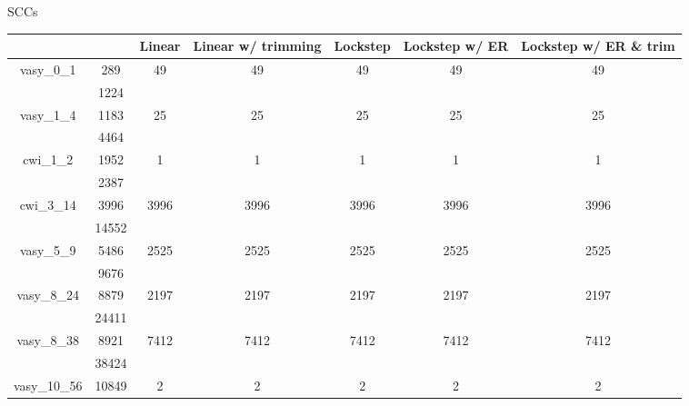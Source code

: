 \documentclass[../master/master.tex]{subfiles}
\begin{document}
SCCs
\begin{center}
\begin{tabular}{ |c|c||c||c||c||c||c|| } 
\hline
 \multicolumn{2}{|c||}{} & Linear & Linear w/ trimming & Lockstep & Lockstep w/ ER & Lockstep w/ ER \& trim \\
\hline
\multirow{2}{3.8em}{vasy\_0\_1} & 289 & \multirow{2}{3.8em}{49} & \multirow{2}{3.8em}{49} & \multirow{2}{3.8em}{49} & \multirow{2}{3.8em}{49} & \multirow{2}{3.8em}{49} \\
\cline{2-2}
 & 1224  & & & & & \\
\hline
\multirow{2}{3.8em}{vasy\_1\_4} & 1183 & \multirow{2}{3.8em}{25} & \multirow{2}{3.8em}{25} & \multirow{2}{3.8em}{25} & \multirow{2}{3.8em}{25} & \multirow{2}{3.8em}{25} \\
\cline{2-2}
 & 4464  & & & & & \\
\hline
\multirow{2}{3.8em}{cwi\_1\_2} & 1952 & \multirow{2}{3.8em}{1} & \multirow{2}{3.8em}{1} & \multirow{2}{3.8em}{1} & \multirow{2}{3.8em}{1} & \multirow{2}{3.8em}{1} \\
\cline{2-2}
 & 2387  & & & & & \\
\hline
\multirow{2}{3.8em}{cwi\_3\_14} & 3996 & \multirow{2}{3.8em}{3996} & \multirow{2}{3.8em}{3996} & \multirow{2}{3.8em}{3996} & \multirow{2}{3.8em}{3996} & \multirow{2}{3.8em}{3996} \\
\cline{2-2}
 & 14552  & & & & & \\
\hline
\multirow{2}{3.8em}{vasy\_5\_9} & 5486 & \multirow{2}{3.8em}{2525} & \multirow{2}{3.8em}{2525} & \multirow{2}{3.8em}{2525} & \multirow{2}{3.8em}{2525} & \multirow{2}{3.8em}{2525} \\
\cline{2-2}
 & 9676  & & & & & \\
\hline
\multirow{2}{3.8em}{vasy\_8\_24} & 8879 & \multirow{2}{3.8em}{2197} & \multirow{2}{3.8em}{2197} & \multirow{2}{3.8em}{2197} & \multirow{2}{3.8em}{2197} & \multirow{2}{3.8em}{2197} \\
\cline{2-2}
 & 24411  & & & & & \\
\hline
\multirow{2}{3.8em}{vasy\_8\_38} & 8921 & \multirow{2}{3.8em}{7412} & \multirow{2}{3.8em}{7412} & \multirow{2}{3.8em}{7412} & \multirow{2}{3.8em}{7412} & \multirow{2}{3.8em}{7412} \\
\cline{2-2}
 & 38424  & & & & & \\
\hline
\multirow{2}{3.8em}{vasy\_10\_56} & 10849 & \multirow{2}{3.8em}{2} & \multirow{2}{3.8em}{2} & \multirow{2}{3.8em}{2} & \multirow{2}{3.8em}{2} & \multirow{2}{3.8em}{2} \\

\end{tabular}
\end{center}
\end{document}
